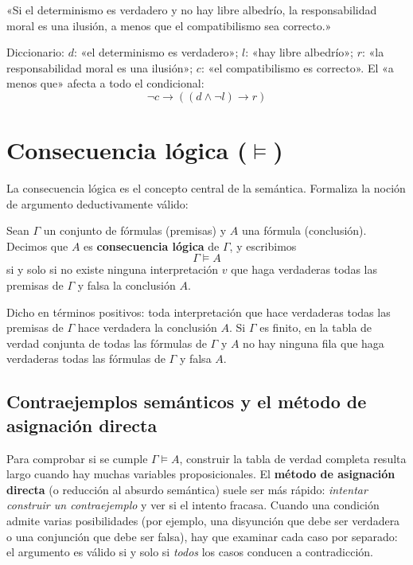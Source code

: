 \begin{ejemplo}
«Si el determinismo es verdadero y no hay libre albedrío, la responsabilidad moral es una ilusión, a menos que el compatibilismo sea correcto.»

\noindent Diccionario: $d$: «el determinismo es verdadero»; $l$: «hay libre albedrío»; $r$: «la responsabilidad moral es una ilusión»; $c$: «el compatibilismo es correcto». El «a menos que» afecta a todo el condicional:
\[
\neg c \to ((d \land \neg l) \to r)
\]
\end{ejemplo}


\section{Consecuencia lógica (\texorpdfstring{$\models$}{consecuencia})}

La consecuencia lógica es el concepto central de la
semántica. Formaliza la noción de argumento deductivamente válido:  

\begin{definition}
Sean $\Gamma$ un conjunto de fórmulas (premisas) y $A$ una fórmula (conclusión). Decimos que $A$ es \textbf{consecuencia lógica} de $\Gamma$, y escribimos
\[
\Gamma \models A
\]
si y solo si no existe ninguna interpretación $v$ que haga verdaderas todas las premisas de $\Gamma$ y falsa la conclusión $A$.

Dicho en términos positivos: toda interpretación que hace verdaderas
todas las premisas de $\Gamma$ hace verdadera la
conclusión $A$. Si $\Gamma$ es finito, en la tabla de verdad conjunta de todas las fórmulas
de $\Gamma$ y $A$ no hay ninguna fila que haga verdaderas todas
las fórmulas de $\Gamma$ y falsa $A$. 
\end{definition}

\subsection{Contraejemplos semánticos y el método de asignación directa}

Para comprobar si se cumple $\Gamma \models A$, construir
la tabla de verdad completa resulta largo cuando hay muchas variables proposicionales. El \textbf{método de asignación directa} (o reducción al absurdo semántica) suele ser más rápido: \emph{intentar construir un contraejemplo} y ver si el intento fracasa. Cuando una condición admite varias posibilidades (por ejemplo, una disyunción que debe ser verdadera o una conjunción que debe ser falsa), hay que examinar cada caso por separado: el argumento es válido si y solo si \emph{todos} los casos conducen a contradicción.

